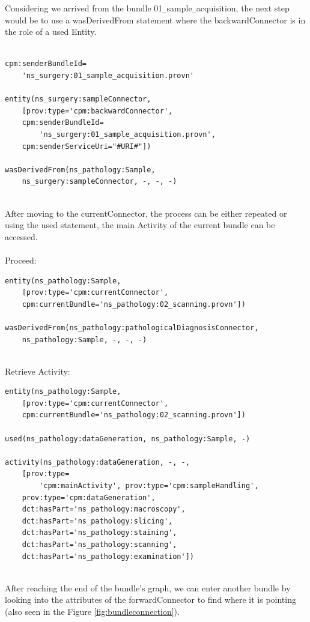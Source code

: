 \documentclass[
  digital,     %
  oneside,     %
  nosansbold,  %
  nocolorbold, %
  lof,         %
  lot,         %
]{fithesis4}
\begin{document}
Considering we arrived from the bundle 01\verb|_|sample\verb|_|acquisition, the next step would be to use a wasDerivedFrom statement where the backwardConnector is in the role of a used Entity. 

\begin{verbatim}

cpm:senderBundleId=
    'ns_surgery:01_sample_acquisition.provn'

entity(ns_surgery:sampleConnector,
    [prov:type='cpm:backwardConnector',
    cpm:senderBundleId=
        'ns_surgery:01_sample_acquisition.provn', 
    cpm:senderServiceUri="#URI#"])

wasDerivedFrom(ns_pathology:Sample, 
    ns_surgery:sampleConnector, -, -, -)
    
\end{verbatim}

After moving to the currentConnector, the process can be either repeated or using the used statement, the main Activity of the current bundle can be accessed.\\\\Proceed: 
\begin{verbatim}
entity(ns_pathology:Sample, 
    [prov:type='cpm:currentConnector',
    cpm:currentBundle='ns_pathology:02_scanning.provn'])

wasDerivedFrom(ns_pathology:pathologicalDiagnosisConnector, 
    ns_pathology:Sample, -, -, -)
    
\end{verbatim}
Retrieve Activity:
\begin{verbatim}
entity(ns_pathology:Sample, 
    [prov:type='cpm:currentConnector',
    cpm:currentBundle='ns_pathology:02_scanning.provn'])

used(ns_pathology:dataGeneration, ns_pathology:Sample, -)

activity(ns_pathology:dataGeneration, -, -, 
    [prov:type=
        'cpm:mainActivity', prov:type='cpm:sampleHandling',
    prov:type='cpm:dataGeneration', 
    dct:hasPart='ns_pathology:macroscopy', 
    dct:hasPart='ns_pathology:slicing',
    dct:hasPart='ns_pathology:staining', 
    dct:hasPart='ns_pathology:scanning',
    dct:hasPart='ns_pathology:examination'])
    
\end{verbatim}

After reaching the end of the bundle's graph, we can enter another bundle by looking into the attributes of the forwardConnector to find where it is pointing (also seen in the Figure \ref{fig:bundleconnection}).
\end{document}
